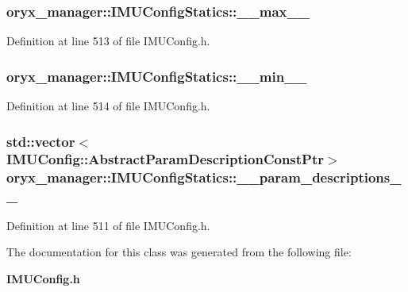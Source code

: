 \subsubsection[{\-\_\-\-\_\-max\-\_\-\-\_\-}]{ {\bf oryx\-\_\-manager\-::\-I\-M\-U\-Config\-Statics\-::\-\_\-\-\_\-max\-\_\-\-\_\-}\hspace{0.3cm}{\ttfamily  [private]}}\label{classoryx__manager_1_1IMUConfigStatics_a38db5f0ac32c95f4326b6ad444cc5a9a}


\-Definition at line 513 of file \-I\-M\-U\-Config.\-h.

\subsubsection[{\-\_\-\-\_\-min\-\_\-\-\_\-}]{ {\bf oryx\-\_\-manager\-::\-I\-M\-U\-Config\-Statics\-::\-\_\-\-\_\-min\-\_\-\-\_\-}\hspace{0.3cm}{\ttfamily  [private]}}\label{classoryx__manager_1_1IMUConfigStatics_a9855f019349ff6868ac36901d4332c20}


\-Definition at line 514 of file \-I\-M\-U\-Config.\-h.

\subsubsection[{\-\_\-\-\_\-param\-\_\-descriptions\-\_\-\-\_\-}]{\setlength{\rightskip}{0pt plus 5cm}std\-::vector$<${\bf \-I\-M\-U\-Config\-::\-Abstract\-Param\-Description\-Const\-Ptr}$>$ {\bf oryx\-\_\-manager\-::\-I\-M\-U\-Config\-Statics\-::\-\_\-\-\_\-param\-\_\-descriptions\-\_\-\-\_\-}\hspace{0.3cm}{\ttfamily  [private]}}\label{classoryx__manager_1_1IMUConfigStatics_acd69a544c62ee138a70e213d47cc51ef}


\-Definition at line 511 of file \-I\-M\-U\-Config.\-h.



\-The documentation for this class was generated from the following file\-:\begin{DoxyCompactItemize}
\item 
{\bf \-I\-M\-U\-Config.\-h}\end{DoxyCompactItemize}
